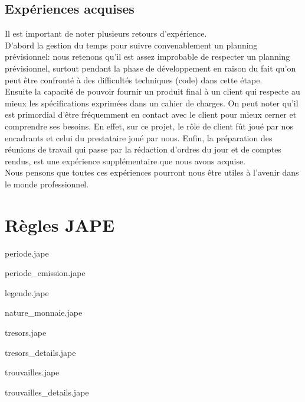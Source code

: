 \documentclass[a4paper, 11pt]{report}
\newcommand{\includecode}[1]{}
\begin{document}
\section{Expériences acquises}
Il est important de noter plusieurs retours d'expérience.\\D'abord la gestion du temps pour suivre convenablement un planning prévisionnel: nous retenons qu'il est assez improbable de respecter un planning prévisionnel, surtout pendant la phase de développement en raison du fait qu'on peut être confronté à des difficultés techniques (code) dans cette étape.\\
Ensuite la capacité de pouvoir fournir un produit final à un client qui respecte au mieux les spécifications exprimées dans un cahier de charges. On peut noter qu'il est primordial d'être fréquemment en contact avec le client pour mieux cerner et comprendre ses besoins. En effet, sur ce projet, le rôle de client fût joué par nos encadrants et celui du prestataire joué par nous.
Enfin, la préparation des réunions de travail qui passe par la rédaction d'ordres du jour et de comptes rendus, est une expérience supplémentaire que nous avons acquise.\\
Nous pensons que toutes ces expériences pourront nous être utiles à l'avenir dans le monde professionnel.
\newpage


\appendix
\chapter{Règles JAPE}
periode.jape
\includecode{code/temporelle/periode.jape}
periode\_emission.jape
\includecode{code/temporelle/periode_emission.jape}
legende.jape
\includecode{code/thematique/legende.jape}
nature\_monnaie.jape
\includecode{code/thematique/nature_monnaie.jape}
tresors.jape
\includecode{code/thematique/tresors.jape}
tresors\_details.jape
\includecode{code/thematique/tresors_details.jape}
trouvailles.jape
\includecode{code/thematique/trouvailles.jape}
trouvailles\_details.jape
\includecode{code/thematique/trouvailles_details.jape}
\end{document}
